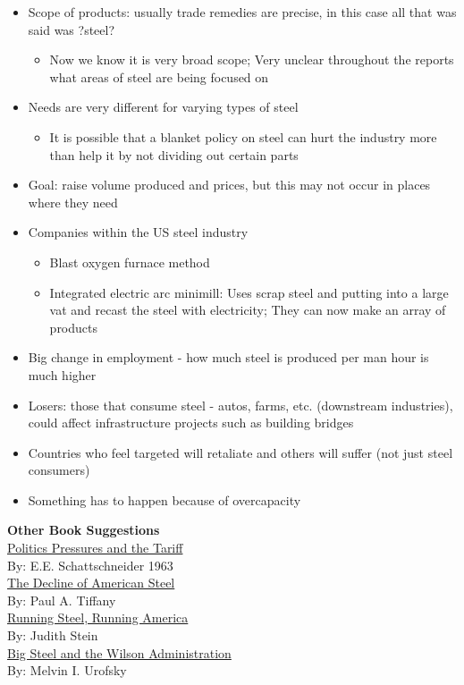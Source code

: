 \documentclass[10pt]{article}
\begin{document}
\begin{itemize}
  \item Scope of products: usually trade remedies are precise, in this case all that was said was ?steel? 
\begin{itemize}
  \item Now we know it is very broad scope; Very unclear throughout the reports what areas of steel are being focused on
\end{itemize}
  \item Needs are very different for varying types of steel
\begin{itemize}
  \item It is possible that a blanket policy on steel can hurt the industry more than help it by not dividing out certain parts
\end{itemize} 
  \item Goal: raise volume produced and prices, but this may not occur in places where they need 
  \item Companies within the US steel industry 
\begin{itemize}
  \item Blast oxygen furnace method
  \item Integrated electric arc minimill: Uses scrap steel and putting into a large vat and recast the steel with electricity; They can now make an array of products 
\end{itemize} 
  \item Big change in employment - how much steel is produced per man hour is much higher
  \item Losers: those that consume steel - autos, farms, etc. (downstream industries), could affect infrastructure projects such as building bridges
  \item Countries who feel targeted will retaliate and others will suffer (not just steel consumers)
  \item Something has to happen because of overcapacity
\end{itemize}

\large\textbf{Other Book Suggestions}\\
\underline{Politics Pressures and the Tariff}\\
By: E.E. Schattschneider 1963\\
\underline{The Decline of American Steel}\\
By: Paul A. Tiffany\\
\underline{Running Steel, Running America}\\
By: Judith Stein\\
\underline{Big Steel and the Wilson Administration}\\
By: Melvin I. Urofsky\\
\end{document}
